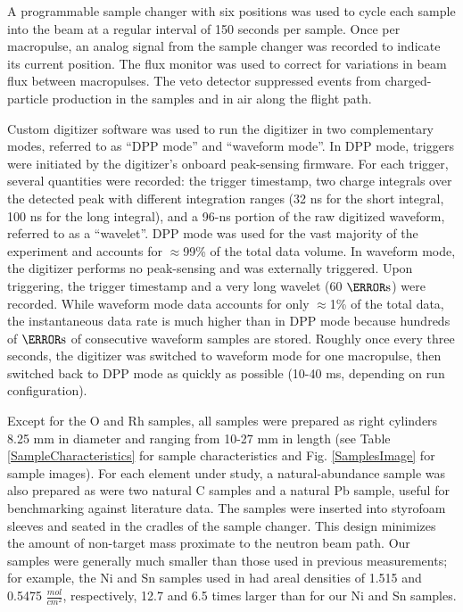 \documentclass[twocolumn,secnumarabic,amssymb, nobibnotes, aps, prl,
superscriptaddress, nobalancelastpage]{revtex4}
\begin{document}
A programmable sample changer with six positions
was used to cycle each sample into the beam at a regular interval of 150 seconds 
per sample. Once per macropulse, an analog signal from the sample changer
was recorded to indicate its current position.
The flux monitor was used to correct for variations in beam flux between 
macropulses. The veto detector suppressed events from charged-particle production 
in the samples and in air along the flight path.

Custom digitizer software was used to run the 
digitizer in two complementary modes, referred to as ``DPP mode'' and ``waveform 
mode''. In DPP mode, triggers were initiated by the digitizer's onboard
peak-sensing firmware. For each trigger, several quantities were recorded: the trigger 
timestamp, two charge integrals over the detected peak with different
integration ranges (32 ns for the short integral, 100 ns for the long integral),
and a 96-ns portion of the raw digitized waveform, referred to as a ``wavelet''.
DPP mode was used for the vast majority of the 
experiment and accounts for $\approx$99\% of the total data volume. In waveform mode, 
the digitizer performs no peak-sensing and was externally triggered. Upon 
triggering, the trigger timestamp and a very long wavelet (60 $\micro\second$) 
were recorded. While waveform mode data accounts for only $\approx$1\% of the total data, 
the instantaneous data rate is much higher than in DPP 
mode because hundreds of $\micro\second$ of consecutive waveform samples are 
stored. Roughly once every three seconds, the digitizer was switched to 
waveform mode for one macropulse, then switched back to DPP mode as quickly as
possible (10-40 ms, depending on run configuration).  

Except for the O and Rh samples, all samples were prepared as right
cylinders 8.25 mm in diameter and ranging from 10-27 mm in length (see
Table \ref{SampleCharacteristics} for sample characteristics and Fig. \ref{SamplesImage}
for sample images). For each element under study, a natural-abundance sample
was also prepared as were two natural C
samples and a natural Pb sample, useful for benchmarking against
literature data. The samples
were inserted into styrofoam sleeves and seated in the cradles of the sample
changer. This design minimizes the amount of non-target mass proximate to the
neutron beam path. Our samples were generally
much smaller than those used in previous measurements;
for example, the Ni and Sn samples used in \cite{Abfalterer2001,
Finlay1993} had areal densities of 1.515 and 0.5475
$\frac{mol}{cm^{2}}$, respectively, 12.7 and 6.5 times larger than for our
Ni and Sn samples. 
\end{document}
